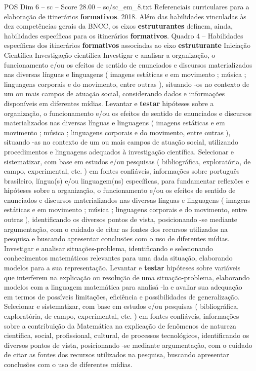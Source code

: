 \begin{textsample}{POS Dim 6 – sc – Score 28.00 – sc/sc\_em\_8.txt}
Referenciais curriculares para a elaboração de itinerários \textbf{formativos}. 2018.
Além das habilidades vinculadas às dez competências gerais da BNCC, os eixos \textbf{estruturantes} definem, ainda, habilidades específicas para os itinerários \textbf{formativos}.
Quadro 4 – Habilidades específicas dos itinerários \textbf{formativos} associadas ao eixo \textbf{estruturante} Iniciação Científica Investigação científica Investigar e analisar a organização, o funcionamento e/ou os efeitos de sentido de enunciados e discursos materializados nas diversas línguas e linguagens ( imagens estáticas e em movimento ; música ; linguagens corporais e do movimento, entre outras ), situando -os no contexto de um ou mais campos de atuação social, considerando dados e informações disponíveis em diferentes mídias.
Levantar e \textbf{testar} hipóteses sobre a organização, o funcionamento e/ou os efeitos de sentido de enunciados e discursos materializados nas diversas línguas e linguagens ( imagens estáticas e em movimento ; música ; linguagens corporais e do movimento, entre outras ), situando -as no contexto de um ou mais campos de atuação social, utilizando procedimentos e linguagens adequados à investigação científica.
Selecionar e sistematizar, com base em estudos e/ou pesquisas ( bibliográfica, exploratória, de campo, experimental, etc. ) em fontes confiáveis, informações sobre português brasileiro, língua(s) e/ou linguagem(ns) específicas, para fundamentar reflexões e hipóteses sobre a organização, o funcionamento e/ou os efeitos de sentido de enunciados e discursos materializados nas diversas línguas e linguagens ( imagens estáticas e em movimento ; música ; linguagens corporais e do movimento, entre outras ), identificando os diversos pontos de vista, posicionando -se mediante argumentação, com o cuidado de citar as fontes dos recursos utilizados na pesquisa e buscando apresentar conclusões com o uso de diferentes mídias.
Investigar e analisar situações-problema, identificando e selecionando conhecimentos matemáticos relevantes para uma dada situação, elaborando modelos para a sua representação.
Levantar e \textbf{testar} hipóteses sobre variáveis que interferem na explicação ou resolução de uma situação-problema, elaborando modelos com a linguagem matemática para analisá -la e avaliar sua adequação em termos de possíveis limitações, eficiência e possibilidades de generalização.
Selecionar e sistematizar, com base em estudos e/ou pesquisas ( bibliográfica, exploratória, de campo, experimental, etc. ) em fontes confiáveis, informações sobre a contribuição da Matemática na explicação de fenômenos de natureza científica, social, profissional, cultural, de processos tecnológicos, identificando os diversos pontos de vista, posicionando -se mediante argumentação, com o cuidado de citar as fontes dos recursos utilizados na pesquisa, buscando apresentar conclusões com o uso de diferentes mídias.

\end{textsample}
